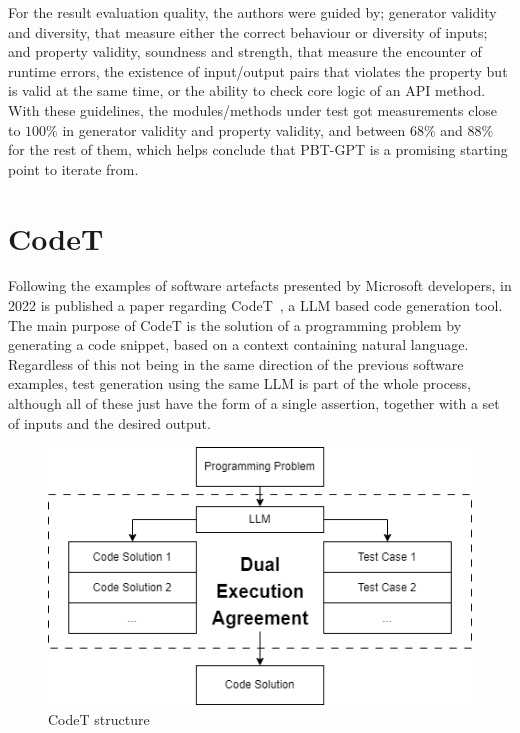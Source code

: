 \documentclass[%
  chapterprefix=false,%
  open=right,%
  twoside=true,%
  paper=a4,%
  logofile={Figures/logo.png},%
  thesistype=master,%
  UKenglish,%
]{se2thesis}
\begin{document}
For the result evaluation quality, the authors were guided by; generator validity and diversity, that measure either the correct behaviour or diversity of inputs; and property validity, soundness and strength, that measure the encounter of runtime errors, the existence of input/output pairs that violates the property but is valid at the same time, or the ability to check core logic of an API method.
With these guidelines, the modules/methods under test got measurements close to \(100\%\) in generator validity and property validity, and between \(68\%\) and \(88\%\) for the rest of them, which helps conclude that PBT-GPT is a promising starting point to iterate from.

\section{CodeT}

Following the examples of software artefacts presented by Microsoft developers, in 2022 is published a paper regarding CodeT~\cite{DBLP:journals/corr/abs-2207-10397}, a LLM based code generation tool.
The main purpose of CodeT is the solution of a programming problem by generating a code snippet, based on a context containing natural language.
Regardless of this not being in the same direction of the previous software examples, test generation using the same LLM is part of the whole process, although all of these just have the form of a single assertion, together with a set of inputs and the desired output.

\begin{figure}[tb]
  \centering 
  \includegraphics[width=.99\textwidth]{Figures/codet.png}
  \caption{CodeT structure}\label{fig:codet}
\end{figure}
\end{document}

